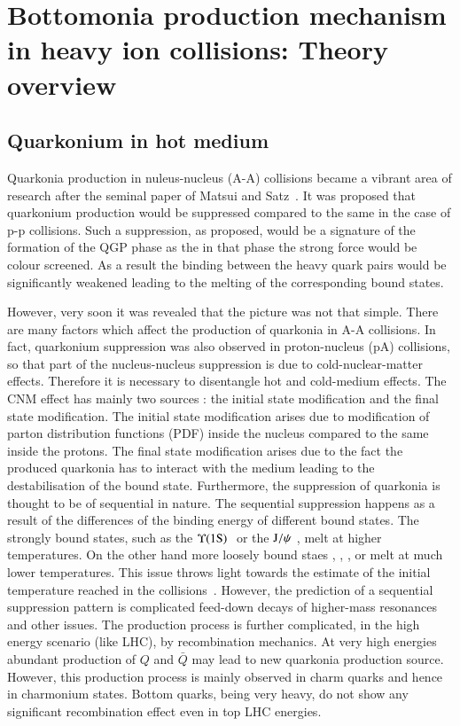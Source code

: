 \section{Bottomonia production mechanism in heavy ion collisions: Theory overview}
\label{sec:Bottomonia_hi}
\subsection{Quarkonium in hot medium}
\label{sec:media_sec3}

 Quarkonia production in nuleus-nucleus (A-A) collisions  became a vibrant area of research after the seminal 
paper of Matsui and Satz~\cite{Matsui:1986dk}. It was proposed that quarkonium production would be suppressed
compared to the same in the case of p-p collisions.  Such a suppression, as proposed, would be a signature of 
the formation of the QGP phase as the in that phase the strong force would be colour screened. As a result 
the binding between the heavy quark pairs would be significantly weakened leading to the melting of the corresponding 
bound states. 

However, very soon it was revealed that the picture was not that simple. There are many factors which affect the 
production of quarkonia in A-A collisions. 
In fact, quarkonium suppression was also observed in proton-nucleus (pA)
collisions, so that part of the nucleus-nucleus suppression is due to 
cold-nuclear-matter effects. Therefore it is necessary to disentangle hot 
and cold-medium effects. The CNM effect has mainly two sources : the initial state modification and the 
final state modification. The initial state modification arises due to modification of parton distribution 
functions (PDF) inside the nucleus compared to the same inside the protons. The final state modification 
arises due to the  fact the produced quarkonia has to interact with the medium leading to the destabilisation
of the bound state. Furthermore, the suppression of quarkonia is thought to be of sequential in nature.  
The sequential suppression happens as a result of the differences of the  binding energy of different bound states. 
The strongly bound states, such as the $\Upsilon\mathrm{(1S)}\hspace {0.05in}$ or the $\mathrm{J}/\psi\hspace {0.05in}$,  melt at higher 
temperatures. On the other hand  more loosely bound staes \psiP, \chic, \chib, 
\upsb or \upsc  melt at much lower temperatures.  This issue throws light towards the 
 estimate of the initial temperature reached in 
the collisions~\cite{Digal:2001ue}. However, the prediction of a sequential 
suppression pattern is complicated feed-down 
decays of higher-mass resonances and other issues. The production process is further 
complicated, in the high energy scenario (like LHC), by recombination mechanics. At very 
high energies abundant production of $Q$ and $\bar Q$ may lead to new quarkonia production 
source. However, this production process is mainly observed in charm quarks and hence in charmonium 
states. Bottom quarks, being very heavy, do not show any significant recombination effect even in top 
LHC energies.   

